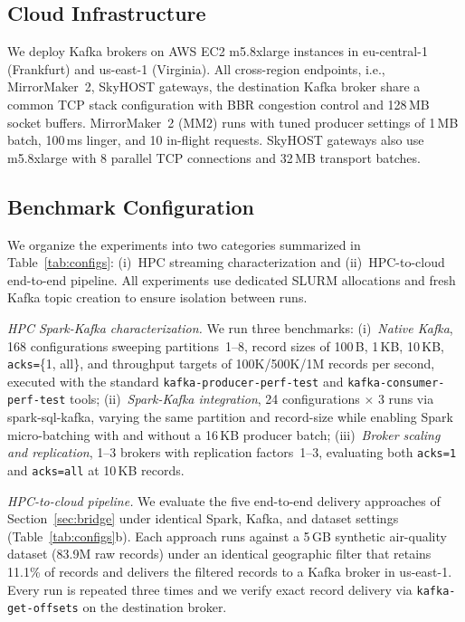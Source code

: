 \documentclass[runningheads]{llncs}
\begin{document}
\subsection{Cloud Infrastructure}
We deploy Kafka brokers on AWS EC2 m5.8xlarge instances in eu-central-1 (Frankfurt) and us-east-1 (Virginia). All cross-region endpoints, i.e., MirrorMaker~2, SkyHOST gateways, the destination Kafka broker share a common TCP stack configuration with BBR congestion control and 128\,MB socket buffers. MirrorMaker~2 (MM2) runs with tuned producer settings of 1\,MB batch, 100\,ms linger, and 10 in-flight requests. SkyHOST gateways also use m5.8xlarge with 8 parallel TCP connections and 32\,MB transport batches.

\subsection{Benchmark Configuration}

We organize the experiments into two categories summarized in
Table~\ref{tab:configs}: (i)~HPC streaming characterization and
(ii)~HPC-to-cloud end-to-end pipeline. All experiments use dedicated SLURM allocations and fresh Kafka topic creation to ensure isolation between runs.

\textit{HPC Spark-Kafka characterization.} We run three benchmarks: (i)~\emph{Native Kafka}, 168 configurations sweeping partitions~1--8, record sizes of 100\,B, 1\,KB, 10\,KB, \texttt{acks=}\{1, all\}, and throughput targets of 100K/500K/1M records per second, executed with the standard \texttt{kafka-producer-perf-test} and \texttt{kafka-consumer-perf-test} tools;
(ii)~\emph{Spark-Kafka integration}, 24 configurations $\times$ 3 runs via spark-sql-kafka, varying the same partition and record-size
while enabling Spark micro-batching with and without a 16\,KB producer batch; (iii)~\emph{Broker scaling and replication}, 1--3 brokers with replication factors~1--3, evaluating both \texttt{acks=1} and \texttt{acks=all} at 10\,KB records.

\textit{HPC-to-cloud pipeline.} We evaluate the five end-to-end delivery approaches of Section~\ref{sec:bridge} under identical Spark, Kafka, and dataset settings (Table~\ref{tab:configs}b). Each approach runs against a 5\,GB synthetic air-quality dataset (83.9M raw records) under an identical geographic filter that retains 11.1\% of records and delivers the filtered records to a Kafka broker in us-east-1. Every run is repeated three times and we verify exact record delivery via \texttt{kafka-get-offsets} on the destination broker.
\end{document}
